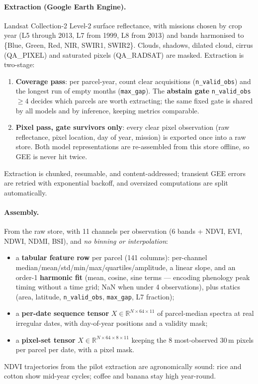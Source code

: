 \documentclass[11pt,a4paper]{article}
\begin{document}
\paragraph{Extraction (Google Earth Engine).} Landsat Collection-2 Level-2 surface reflectance,
with missions chosen by crop year (L5 through 2013, L7 from 1999, L8 from 2013) and bands
harmonised to \{Blue, Green, Red, NIR, SWIR1, SWIR2\}. Clouds, shadows, dilated cloud, cirrus
(QA\_PIXEL) and saturated pixels (QA\_RADSAT) are masked. Extraction is two-stage:
\begin{enumerate}[leftmargin=1.5em]
\item \textbf{Coverage pass}: per parcel-year, count clear acquisitions (\texttt{n\_valid\_obs})
and the longest run of empty months (\texttt{max\_gap}). The \textbf{abstain gate}
\texttt{n\_valid\_obs} $\geq 4$ decides which parcels are worth extracting; the same fixed gate
is shared by all models and by inference, keeping metrics comparable.
\item \textbf{Pixel pass, gate survivors only}: every clear pixel observation (raw reflectance,
pixel location, day of year, mission) is exported once into a raw store. Both model
representations are re-assembled from this store offline, so GEE is never hit twice.
\end{enumerate}
Extraction is chunked, resumable, and content-addressed; transient GEE errors are retried with
exponential backoff, and oversized computations are split automatically.

\paragraph{Assembly.} From the raw store, with 11 channels per observation (6 bands + NDVI,
EVI, NDWI, NDMI, BSI), and \emph{no binning or interpolation}:
\begin{itemize}[leftmargin=1.5em]
\item a \textbf{tabular feature row} per parcel (141 columns): per-channel
median/mean/std/min/max/quartiles/amplitude, a linear slope, and an order-1 \textbf{harmonic
fit} (mean, cosine, sine terms --- encoding phenology peak timing without a time grid; NaN when
under 4 observations), plus statics (area, latitude, \texttt{n\_valid\_obs}, \texttt{max\_gap},
L7 fraction);
\item a \textbf{per-date sequence tensor} $X \in \mathbb{R}^{N\times 64\times 11}$ of
parcel-median spectra at real irregular dates, with day-of-year positions and a validity mask;
\item a \textbf{pixel-set tensor} $X \in \mathbb{R}^{N\times 64\times 8\times 11}$ keeping the
8 most-observed 30\,m pixels per parcel per date, with a pixel mask.
\end{itemize}
NDVI trajectories from the pilot extraction are agronomically sound: rice and cotton show
mid-year cycles; coffee and banana stay high year-round.
\end{document}
